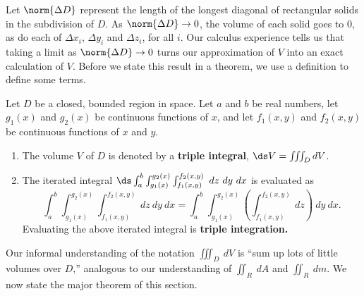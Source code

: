 Let $\norm{\Delta D}$ represent the length of the longest diagonal of rectangular solids in the subdivision of $D$. As $\norm{\Delta D}\to 0$, the volume of each solid goes to 0, as do each of $\Delta x_i$, $\Delta y_i$ and $\Delta z_i$, for all $i$. Our calculus experience tells us that taking a limit as $\norm{\Delta D}\to 0$ turns our approximation of $V$ into an exact calculation of $V$. Before we state this result in a theorem, we use a definition to define some terms.

{
\begin{definition}\label{def:triple_integral}
Let $D$ be a closed, bounded region in space. Let $a$ and $b$ be real numbers, let $g_1(x)$ and $g_2(x)$ be continuous functions of $x$, and let $f_1(x,y)$ and $f_2(x,y)$ be continuous functions of $x$ and $y$.
\begin{enumerate}
	\item	The volume $V$ of $D$ is denoted by a \textbf{triple integral},
	$\ds V = \iiint_D dV$.
	
	\item The iterated integral $\ds \int_a^b\int_{g_1(x)}^{g_2(x)}\int_{f_1(x,y)}^{f_2(x,y)} \ dz\ dy\ dx$ is evaluated as 
	\[\int_a^b\int_{g_1(x)}^{g_2(x)}\int_{f_1(x,y)}^{f_2(x,y)} \ dz\ dy\ dx=\int_a^b\int_{g_1(x)}^{g_2(x)}\left(\int_{f_1(x,y)}^{f_2(x,y)} \ dz\right)\ dy\ dx.\]
	Evaluating the above iterated integral is \textbf{triple integration.}
\end{enumerate}
\end{definition}
}

Our informal understanding of the notation $\iiint_D\ dV$ is ``sum up lots of little volumes over $D$,'' analogous to our understanding of $\iint_R\ dA$ and $\iint_R\ dm$. We now state the major theorem of this section.

